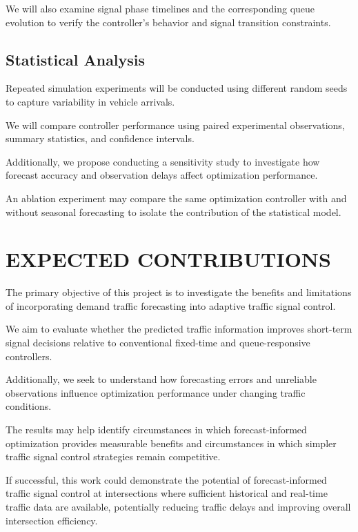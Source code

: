 \documentclass[letterpaper,12pt,conference]{ieeeconf}
\begin{document}
We will also examine signal phase timelines and the
corresponding queue evolution to verify the controller's
behavior and signal transition constraints.

\subsection{Statistical Analysis}

Repeated simulation experiments will be conducted using
different random seeds to capture variability in vehicle
arrivals.

We will compare controller performance using paired
experimental observations, summary statistics, and
confidence intervals.

Additionally, we propose conducting a sensitivity study
to investigate how forecast accuracy and observation delays affect optimization performance.

An ablation experiment may compare the same optimization
controller with and without seasonal forecasting to
isolate the contribution of the statistical model.

\section{EXPECTED CONTRIBUTIONS}

The primary objective of this project is to investigate
the benefits and limitations of incorporating demand
traffic forecasting into adaptive traffic signal control.

We aim to evaluate whether the predicted traffic information
improves short-term signal decisions relative to
conventional fixed-time and queue-responsive controllers.

Additionally, we seek to understand how forecasting
errors and unreliable observations influence optimization
performance under changing traffic conditions.

The results may help identify circumstances in which
forecast-informed optimization provides measurable
benefits and circumstances in which simpler traffic
signal control strategies remain competitive.

If successful, this work could demonstrate the potential of forecast-informed traffic signal control at intersections where sufficient historical and real-time traffic data are available, potentially reducing traffic delays and improving overall intersection efficiency.
\end{document}
